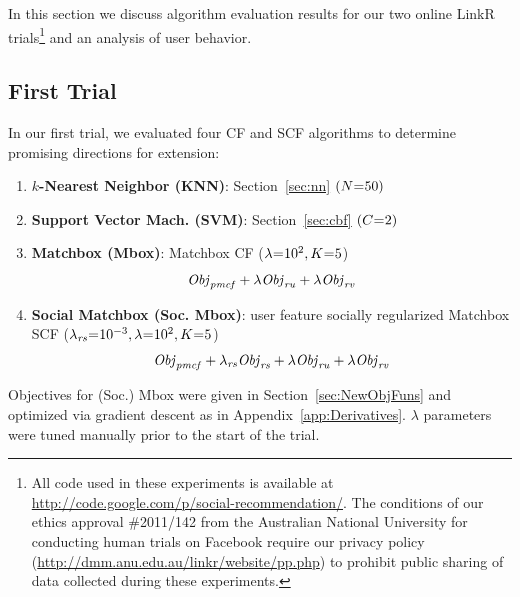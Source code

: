 
In this section we discuss algorithm evaluation results for our two online
LinkR trials\footnote{All code used in these experiments is available at
\url{http://code.google.com/p/social-recommendation/}.  The conditions
of our ethics approval \#2011/142 from the Australian National
University for conducting human trials on Facebook require our
privacy policy
(\url{http://dmm.anu.edu.au/linkr/website/pp.php}) to
prohibit public sharing of data collected during these experiments.}
and an analysis of user behavior.

\subsection{First Trial}

In our first trial, we evaluated four CF and SCF
algorithms to determine promising directions for
extension:
\denselist
\begin{enumerate}
\item {\bf $k$-Nearest Neighbor (KNN)}: Section~\ref{sec:nn} $(N\hspace{-.9mm}=\hspace{-.9mm}50)$
\item {\bf Support Vector Mach. \sq(SVM)}: Section~\ref{sec:cbf} $(C\hspace{-.9mm}=\hspace{-.9mm}2)$
\item {\bf Matchbox (Mbox)}: Matchbox CF ($\lambda\hspace{-.9mm}=\hspace{-.9mm}10^2, K\hspace{-.9mm}=\hspace{-.9mm}5$) %
$$\mathit{Obj}_{\mathit{pmcf}} + \lambda \mathit{Obj}_{\mathit{ru}} + \lambda \mathit{Obj}_{\mathit{rv}}$$
\item {\bf Social Matchbox (Soc. \sqt Mbox)}: \sq
user feature socially regularized Matchbox SCF ($\lambda_{\mathit{rs}}\hspace{-.9mm}=\hspace{-.9mm}10^{-3}, \lambda\hspace{-.9mm}=\hspace{-.9mm}10^2, K\hspace{-.9mm}=\hspace{-.9mm}5$)
$$\mathit{Obj}_{\mathit{pmcf}} + \lambda_{\mathit{rs}} \mathit{Obj}_{\mathit{rs}} + \lambda \mathit{Obj}_{\mathit{ru}} + \lambda \mathit{Obj}_{\mathit{rv}}$$
\end{enumerate}
Objectives for (Soc.) Mbox were given in Section~\ref{sec:NewObjFuns}
and optimized via gradient descent as in 
Appendix~\ref{app:Derivatives}. $\lambda$ parameters were tuned manually
prior to the start of the trial.

